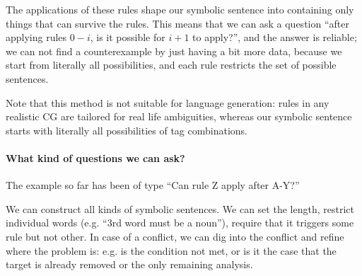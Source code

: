The applications of these rules shape our symbolic sentence into containing only things that can survive the rules. This means that we can ask a question ``after applying rules $0-i$, is it possible for $i+1$ to apply?'', and the answer is reliable; we can not find a counterexample by just having a bit more data, because we start from literally all possibilities, and each rule
restricts the set of possible sentences.

Note that this method is not suitable for language generation: rules in any realistic CG are tailored for real life ambiguities, whereas our symbolic sentence starts with literally all possibilities of tag combinations.

\paragraph{What kind of questions we can ask?}

The example so far has been of type ``Can rule Z apply after A-Y?''

We can construct all kinds of symbolic sentences. We can set the length, restrict individual words (e.g. ``3rd word must be a noun''), require that it triggers some rule but not other.
In case of a conflict, we can dig into the conflict and refine where the problem is: e.g. is the condition not met, or is it the case that the target is already removed or the only remaining analysis.




